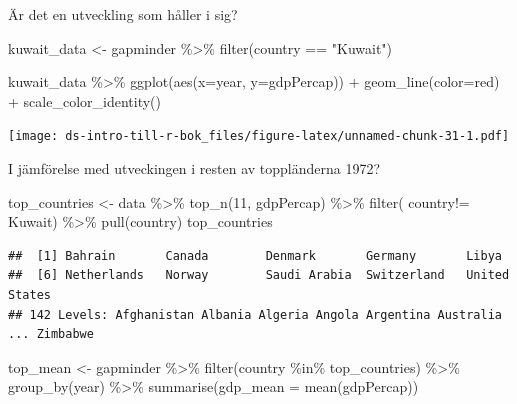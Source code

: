 \documentclass[
]{book}
\newenvironment{Shaded}{\begin{snugshade}}{\end{snugshade}}
\newcommand{\AttributeTok}[1]{\textcolor[rgb]{0.77,0.63,0.00}{#1}}
\newcommand{\DecValTok}[1]{\textcolor[rgb]{0.00,0.00,0.81}{#1}}
\newcommand{\FunctionTok}[1]{\textcolor[rgb]{0.00,0.00,0.00}{#1}}
\newcommand{\NormalTok}[1]{#1}
\newcommand{\OtherTok}[1]{\textcolor[rgb]{0.56,0.35,0.01}{#1}}
\newcommand{\SpecialCharTok}[1]{\textcolor[rgb]{0.00,0.00,0.00}{#1}}
\newcommand{\StringTok}[1]{\textcolor[rgb]{0.31,0.60,0.02}{#1}}
\begin{document}
Är det en utveckling som håller i sig?

\begin{Shaded}
\begin{Highlighting}[]
\NormalTok{kuwait\_data }\OtherTok{\textless{}{-}}\NormalTok{ gapminder }\SpecialCharTok{\%\textgreater{}\%} 
  \FunctionTok{filter}\NormalTok{(country }\SpecialCharTok{==} \StringTok{"Kuwait"}\NormalTok{)}

\NormalTok{kuwait\_data }\SpecialCharTok{\%\textgreater{}\%}
  \FunctionTok{ggplot}\NormalTok{(}\FunctionTok{aes}\NormalTok{(}\AttributeTok{x=}\NormalTok{year, }\AttributeTok{y=}\NormalTok{gdpPercap)) }\SpecialCharTok{+}
  \FunctionTok{geom\_line}\NormalTok{(}\AttributeTok{color=}\StringTok{\textquotesingle{}red\textquotesingle{}}\NormalTok{) }\SpecialCharTok{+} \FunctionTok{scale\_color\_identity}\NormalTok{()}
\end{Highlighting}
\end{Shaded}

\texttt{[image: ds-intro-till-r-bok\_files/figure-latex/unnamed-chunk-31-1.pdf]}

I jämförelse med utveckingen i resten av toppländerna 1972?

\begin{Shaded}
\begin{Highlighting}[]
\NormalTok{top\_countries }\OtherTok{\textless{}{-}}\NormalTok{ data }\SpecialCharTok{\%\textgreater{}\%}  \FunctionTok{top\_n}\NormalTok{(}\DecValTok{11}\NormalTok{, gdpPercap) }\SpecialCharTok{\%\textgreater{}\%} 
  \FunctionTok{filter}\NormalTok{( country}\SpecialCharTok{!=} \StringTok{\textquotesingle{}Kuwait\textquotesingle{}}\NormalTok{) }\SpecialCharTok{\%\textgreater{}\%} 
  \FunctionTok{pull}\NormalTok{(country)}
\NormalTok{top\_countries}
\end{Highlighting}
\end{Shaded}

\begin{verbatim}
##  [1] Bahrain       Canada        Denmark       Germany       Libya        
##  [6] Netherlands   Norway        Saudi Arabia  Switzerland   United States
## 142 Levels: Afghanistan Albania Algeria Angola Argentina Australia ... Zimbabwe
\end{verbatim}

\begin{Shaded}
\begin{Highlighting}[]
\NormalTok{top\_mean }\OtherTok{\textless{}{-}}\NormalTok{ gapminder }\SpecialCharTok{\%\textgreater{}\%} 
  \FunctionTok{filter}\NormalTok{(country }\SpecialCharTok{\%in\%}\NormalTok{ top\_countries) }\SpecialCharTok{\%\textgreater{}\%} 
  \FunctionTok{group\_by}\NormalTok{(year) }\SpecialCharTok{\%\textgreater{}\%}  
  \FunctionTok{summarise}\NormalTok{(}\AttributeTok{gdp\_mean =} \FunctionTok{mean}\NormalTok{(gdpPercap))}
\end{Highlighting}
\end{Shaded}
\end{document}
